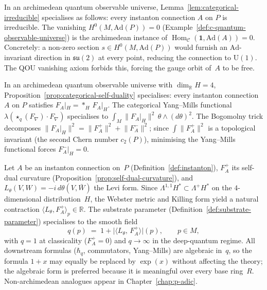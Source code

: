 \begin{example}
\label{lem:irreducible-connection}
\leanok
In an archimedean quantum observable universe,
Lemma~\ref{lem:categorical-irreducible} specialises as follows:
every instanton connection $A$ on $P$ is irreducible.
The vanishing $H^0(M, \mathrm{Ad}(P)) = 0$
(Example~\ref{def:c-quantum-observable-universe}) is the archimedean
instance of $\operatorname{Hom}_{\mathcal{C}}(\mathbf{1},
\mathrm{Ad}(A)) = 0$.  Concretely: a non-zero section
$s \in H^0(M, \mathrm{Ad}(P))$ would furnish an $\mathrm{Ad}$-invariant
direction in $\mathfrak{su}(2)$ at every point, reducing the connection
to $\mathrm{U}(1)$.  The QOU vanishing axiom forbids this, forcing the
gauge orbit of~$A$ to be free.
\end{example}

\begin{example}
\label{prop:self-dual-curvature}
\leanok
In an archimedean quantum observable universe with
$\dim_{\mathbb{R}} H = 4$,
Proposition~\ref{prop:categorical-self-duality} specialises:
every instanton connection $A$ on $P$ satisfies
$F_A|_H = {*_H}\,F_A|_H$.  The categorical Yang--Mills functional
$\lambda(\star_q(F_\nabla) \cdot F_\nabla)$ specialises to
$\int_M \lVert F_A|_H \rVert^2\,\theta \wedge (d\theta)^2$.
The Bogomolny trick decomposes
$\lVert F_A|_H \rVert^2 = \lVert F_A^+ \rVert^2
+ \lVert F_A^- \rVert^2$; since
$\int \lVert F_A^+ \rVert^2$ is a topological invariant
(the second Chern number $c_2(P)$), minimising the Yang--Mills
functional forces $F_A^-|_H = 0$.
\end{example}

\begin{remark}
\label{rem:c-substrate-via-levi}
\label{rem:substrate-contraction}
\label{rem:substrate-exponential}
Let $A$ be an instanton connection on~$P$
(Definition~\ref{def:instanton}), $F_A^+$ its self-dual curvature
(Proposition~\ref{prop:self-dual-curvature}), and
$L_\theta(V, W) = -i\,d\theta(V, \bar{W})$ the Levi form.  Since
$\Lambda^{1,1} H^* \subset \Lambda^+ H^*$ on the $4$-dimensional
distribution~$H$, the Webster metric and Killing form yield a natural
contraction $\langle L_\theta, F_A^+\rangle_p \in \mathbb{R}$.  The
substrate parameter
(Definition~\ref{def:substrate-parameter}) specialises to the smooth
field
\[
  q(p) \;=\; 1 + \bigl\lvert\langle L_\theta,\, F_A^+ \rangle\bigr\rvert(p),
  \qquad p \in M,
\]
with $q = 1$ at classicality ($F_A^+ = 0$) and $q \to \infty$ in the
deep-quantum regime.  All downstream formulas ($\hbar_q$, commutators,
Yang--Mills) are algebraic in~$q$, so the formula $1 + x$ may equally be
replaced by $\exp(x)$ without affecting the theory; the algebraic form is
preferred because it is meaningful over every base ring~$R$.
Non-archimedean analogues appear in Chapter~\ref{chap:p-adic}.
\end{remark}

